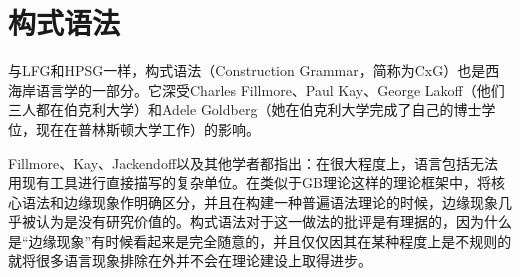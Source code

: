 
\chapter{构式语法}
\label{Kapitel-CxG}

%
%
%
%

与LFG和HPSG一样，构式语法（Construction Grammar，简称为CxG）也是西海岸语言学的一部分。它深受Charles Fillmore、Paul Kay、George Lakoff（他们三人都在伯克利大学）和Adele Goldberg（她在伯克利大学完成了自己的博士学位，现在在普林斯顿大学工作）\citep*{Fillmore88a,FKoC88a,KF99a,Kay2002a,Kay2005a,Goldberg95a,Goldberg2006a}的影响。

Fillmore、Kay、Jackendoff以及其他学者都指出：在很大程度上，语言包括无法用现有工具进行直接描写的复杂单位。在类似于GB理论这样的理论框架中，将核心语法和边缘现象作明确区分\citep[]{Chomsky81a}，并且在构建一种普遍语法理论的时候，边缘现象几乎被认为是没有研究价值的。构式语法对于这一做法的批评是有理据的，因为什么是“边缘现象”有时候看起来是完全随意的\citep{MuellerKernigkeit}，并且仅仅因其在某种程度上是不规则的就将很多语言现象排除在外并不会在理论建设上取得进步。

